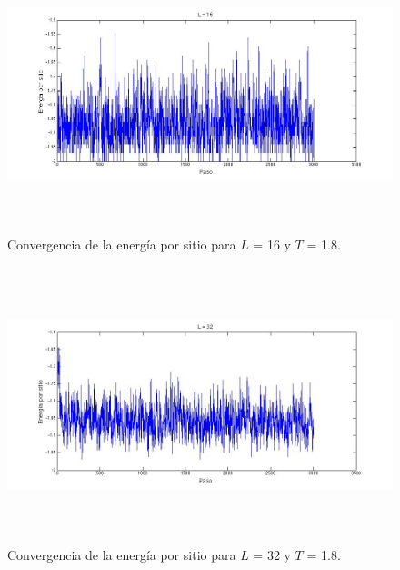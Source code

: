 \documentclass[a4paper,12pt]{article}
\begin{document}
\begin{figure}[H]
\begin{center}
\includegraphics[height=8cm]{../graficos/En_L16_T18.jpg}
\caption[width=5cm]{Convergencia de la energ\'ia por sitio para $L$ = 16 y $T$ = 1.8.}
\end{center}
\end{figure}

\begin{figure}[H]
\begin{center}
\includegraphics[height=8cm]{../graficos/En_L32_T18.jpg}
\caption[width=5cm]{Convergencia de la energ\'ia por sitio para $L$ = 32 y $T$ = 1.8.}
\end{center}
\end{figure}
\end{document}
